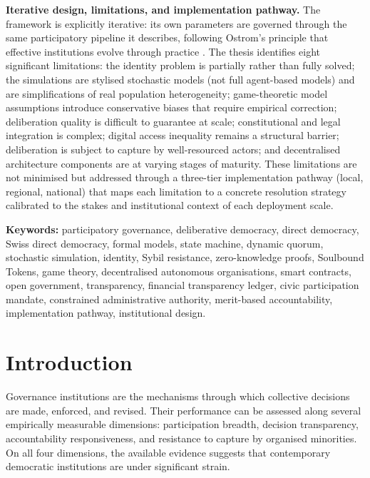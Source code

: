 \documentclass[12pt,a4paper,oneside]{report}
\begin{document}
\vspace{0.7em}
\noindent\textbf{Iterative design, limitations, and implementation pathway.}
The framework is explicitly iterative: its own parameters are governed through the same participatory pipeline it describes, following Ostrom's principle that effective institutions evolve through practice \citep{ostrom1990governing}. The thesis identifies eight significant limitations: the identity problem is partially rather than fully solved; the simulations are stylised stochastic models (not full agent-based models) and are simplifications of real population heterogeneity; game-theoretic model assumptions introduce conservative biases that require empirical correction; deliberation quality is difficult to guarantee at scale; constitutional and legal integration is complex; digital access inequality remains a structural barrier; deliberation is subject to capture by well-resourced actors; and decentralised architecture components are at varying stages of maturity. These limitations are not minimised but addressed through a three-tier implementation pathway (local, regional, national) that maps each limitation to a concrete resolution strategy calibrated to the stakes and institutional context of each deployment scale.

\vspace{0.7em}
\noindent\textbf{Keywords:} participatory governance, deliberative democracy, direct democracy, Swiss direct democracy, formal models, state machine, dynamic quorum, stochastic simulation, identity, Sybil resistance, zero-knowledge proofs, Soulbound Tokens, game theory, decentralised autonomous organisations, smart contracts, open government, transparency, financial transparency ledger, civic participation mandate, constrained administrative authority, merit-based accountability, implementation pathway, institutional design.

\clearpage

\tableofcontents
\clearpage
\listoffigures
\clearpage
\listoftables
\clearpage

\chapter{Introduction}
\label{sec:intro}

Governance institutions are the mechanisms through which collective decisions are made, enforced, and revised. Their performance can be assessed along several empirically measurable dimensions: participation breadth, decision transparency, accountability responsiveness, and resistance to capture by organised minorities. On all four dimensions, the available evidence suggests that contemporary democratic institutions are under significant strain.
\end{document}
